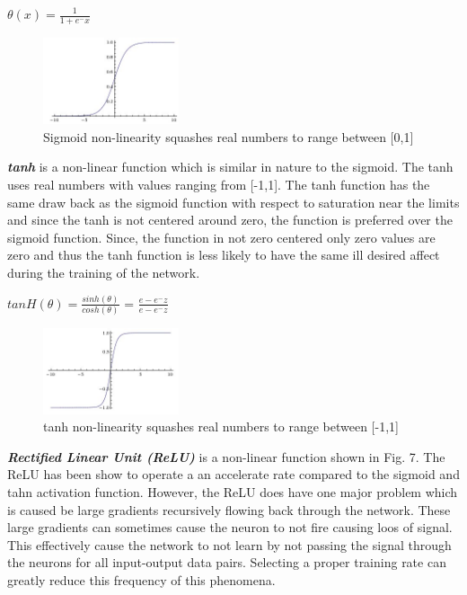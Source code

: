\documentclass[journal]{IEEEtran}
\begin{document}
\begin{center}
$\theta(x) = \frac{1}{1 + e^-x}$
\end{center}

\begin{figure}[h]
    \centering
    \includegraphics[width=4cm]{sigmoid}
    \caption{Sigmoid non-linearity squashes real numbers to range between [0,1]}
\end{figure}

\break
\break
\break

\textbf{\textit{tanh}} is a non-linear function which is similar in nature to the sigmoid.  The tanh uses real numbers with values ranging from [-1,1].  The tanh function has the same draw back as the sigmoid function with respect to saturation near the limits and since the tanh is not centered around zero, the function is preferred over the sigmoid function.  Since, the function in not zero centered only zero values are zero and thus the tanh function is less likely to have the same ill desired affect during the training of the network. 

\begin{center}
$tanH(\theta) = \frac{sinh(\theta)}{cosh(\theta)}$ = $\frac{e - e^-z}{e - e^-z}$
\end{center}
\begin{figure}[h] %
    \centering
    \includegraphics[width=4cm]{tanh}
    \caption{tanh non-linearity squashes real numbers to range between [-1,1]}
\end{figure}

\textbf{\textit{Rectified Linear Unit (ReLU)}} is a non-linear function shown in Fig. 7.  The ReLU has been show to operate a an accelerate rate compared to the sigmoid and tahn activation function.  However, the ReLU does have one major problem which is caused be large gradients recursively flowing back through the network.  These large gradients can sometimes cause the neuron to not fire causing loos of signal.  This effectively cause the network to not learn by not passing the signal through the neurons for all input-output data pairs.  Selecting a proper training rate can greatly reduce this frequency of this phenomena.
\end{document}
